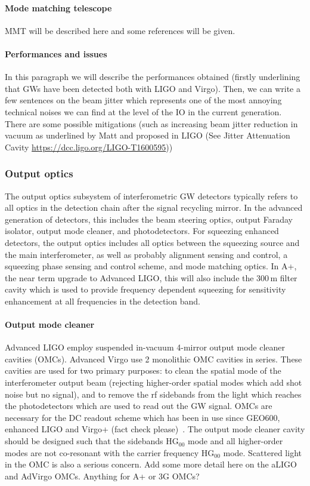 \paragraph{Mode matching telescope}
MMT will be described here and some references will be given.

\paragraph {Performances and issues}
In this paragraph we will describe the performances obtained (firstly underlining that GWs have been detected both with LIGO and Virgo). Then, we can write a few sentences on the beam jitter which represents one of the most annoying technical noises we can find at the level of the IO in the current generation. There are some possible mitigations (such as increasing beam jitter reduction in vacuum as underlined by Matt and proposed in LIGO (See Jitter Attenuation Cavity \url{https://dcc.ligo.org/LIGO-T1600595}))

\subsubsection{Output optics}
The output optics subsystem of interferometric GW detectors typically refers to all optics in the detection chain after the signal recycling mirror. In the advanced generation of detectors, this includes the beam steering optics, output Faraday isolator, output mode cleaner, and photodetectors. For squeezing enhanced detectors, the output optics includes all optics between the squeezing source and the main interferometer, as well as probably alignment sensing and control, a squeezing phase sensing and control scheme, and mode matching optics.
In A+, the near term upgrade to Advanced LIGO, this will also include the 300\,m filter cavity which is used to provide frequency dependent squeezing for sensitivity enhancement at all frequencies in the detection band. 

\paragraph {Output mode cleaner}
Advanced LIGO employ suspended in-vacuum 4-mirror output mode cleaner cavities (OMCs). Advanced Virgo use 2 monolithic OMC cavities in series. 
These cavities are used for two primary purposes: to clean the spatial mode of the interferometer output beam (rejecting higher-order spatial modes which add shot noise but no signal), and to remove the rf sidebands from the light which reaches the photodetectors which are used to read out the GW signal. OMCs are necessary for the DC readout scheme which has been in use since GEO600, enhanced LIGO and Virgo+ (fact check please)~\cite{dcreadout}. 
The output mode cleaner cavity should be designed such that the sidebands HG$_{00}$ mode and all higher-order modes are not co-resonant with the carrier frequency HG$_{00}$ mode. Scattered light in the OMC is also a serious concern. 
Add some more detail here on the aLIGO and AdVirgo OMCs. Anything for A+ or 3G OMCs?

